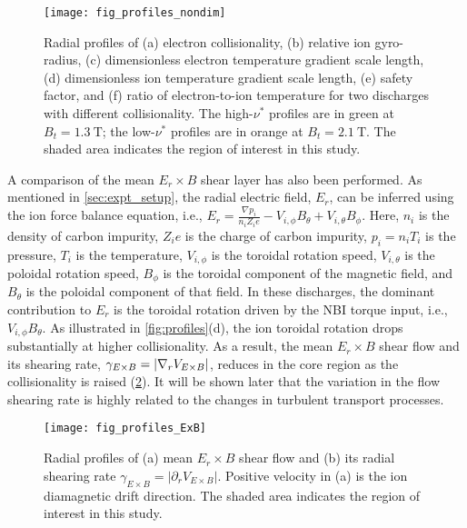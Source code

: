 \documentclass[english,aip,pop,superscriptaddress,preprint,letterpaper]{revtex4-2}
\begin{document}
\begin{figure}
    \texttt{[image: fig\_profiles\_nondim]}
    \caption{\label{fig:profiles_nondim}Radial profiles of (a) electron collisionality, (b) relative ion gyro-radius, (c) dimensionless electron temperature gradient scale length, (d) dimensionless ion temperature gradient scale length, (e) safety factor, and (f) ratio of electron-to-ion temperature for two discharges with different collisionality. The high-\(\nu^*\) profiles are in green at \(B_t=\SI{1.3}{\tesla}\); the low-\(\nu^*\) profiles are in orange at \(B_t=\SI{2.1}{\tesla}\). The shaded area indicates the region of interest in this study.}
\end{figure}

A comparison of the mean $E_{r}\times B$ shear layer has also been performed.
As mentioned in \cref{sec:expt_setup}, the radial electric field, $E_r$, can be inferred using the ion force balance equation, i.e., $ E_r = \frac{\nabla p_i}{n_i Z_i e} - V_{i,\phi} B_\theta + V_{i, \theta} B_\phi$.
Here, $ n_i $ is the density of carbon impurity, $ Z_i e $ is the charge of carbon impurity, $ p_i=n_i T_i $ is the pressure, $ T_i $ is the temperature, $ V_{i,\phi} $ is the toroidal rotation speed, $ V_{i,\theta} $ is the poloidal rotation speed, $ B_\phi $ is the toroidal component of the magnetic field, and $ B_\theta $ is the poloidal component of that field.
In these discharges, the dominant contribution to $E_r$ is the toroidal rotation driven by the NBI torque input, i.e., $ V_{i,\phi} B_\theta $.
As illustrated in \cref{fig:profiles}(d), the ion toroidal rotation drops substantially at higher collisionality.
As a result, the mean $E_{r}\times B$ shear flow and its shearing rate, $ \gamma_{E\times B}=\abs{\nabla_r V_{E\times B}} $, reduces in the core region as the collisionality is raised (\cref{fig:profiles_ExB}).
It will be shown later that the variation in the flow shearing rate is highly related to the changes in turbulent transport processes.

\begin{figure}
	\texttt{[image: fig\_profiles\_ExB]}
	\caption{\label{fig:profiles_ExB}Radial profiles of (a) mean $E_r \times B$ shear flow and (b) its radial shearing rate $\gamma_{E\times B} = |\partial_r V_{E\times B}|$. Positive velocity in (a) is the ion diamagnetic drift direction. The shaded area indicates the region of interest in this study.}
\end{figure}
\end{document}
